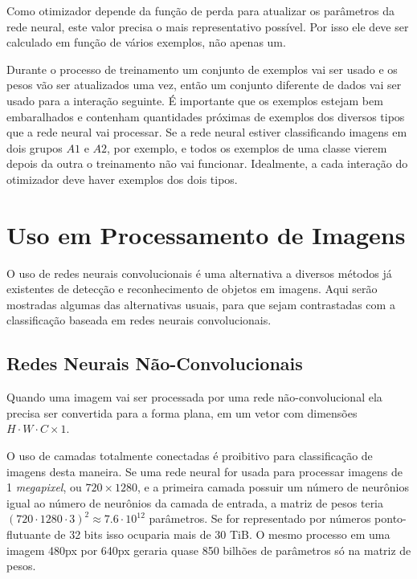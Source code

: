 Como otimizador depende da função de perda para atualizar os parâmetros da rede
neural, este valor precisa o mais representativo possível. Por isso ele deve
ser calculado em função de vários exemplos, não apenas um.

Durante o processo de treinamento um conjunto de exemplos vai ser usado e os
pesos vão ser atualizados uma vez, então um conjunto diferente de dados vai ser
usado para a interação seguinte. É importante que os exemplos estejam bem
embaralhados e contenham quantidades próximas de exemplos dos diversos tipos
que a rede neural vai processar. Se a rede neural estiver classificando imagens
em dois grupos $A1$ e $A2$, por exemplo, e todos os exemplos de uma classe
vierem depois da outra o treinamento não vai funcionar. Idealmente, a cada
interação do otimizador deve haver exemplos dos dois tipos.

%

\section{Uso em Processamento de Imagens}
O uso de redes neurais convolucionais é uma alternativa a diversos métodos já
existentes de detecção e reconhecimento de objetos em imagens. Aqui serão
mostradas algumas das alternativas usuais, para que sejam contrastadas
com a classificação baseada em redes neurais convolucionais.

\subsection{Redes Neurais Não-Convolucionais}
Quando uma imagem vai ser processada por uma rede não-convolucional ela precisa
ser convertida para a forma plana, em um vetor com dimensões
$H \cdot W \cdot C \times 1$.

O uso de camadas totalmente conectadas é proibitivo para classificação de
imagens desta maneira. Se uma rede neural for usada para processar imagens de 1
\emph{megapixel}, ou $720 \times 1280$, e a primeira camada possuir um
número de neurônios igual
ao número de neurônios da camada de entrada, a matriz de pesos teria
$(720 \cdot 1280 \cdot 3)^2 \approx 7.6 \cdot 10^{12}$ parâmetros. Se for
representado por números ponto-flutuante de 32 bits isso ocuparia mais de
30 TiB. O mesmo processo em uma imagem 480px por 640px geraria quase 850
bilhões de parâmetros só na matriz de pesos.

